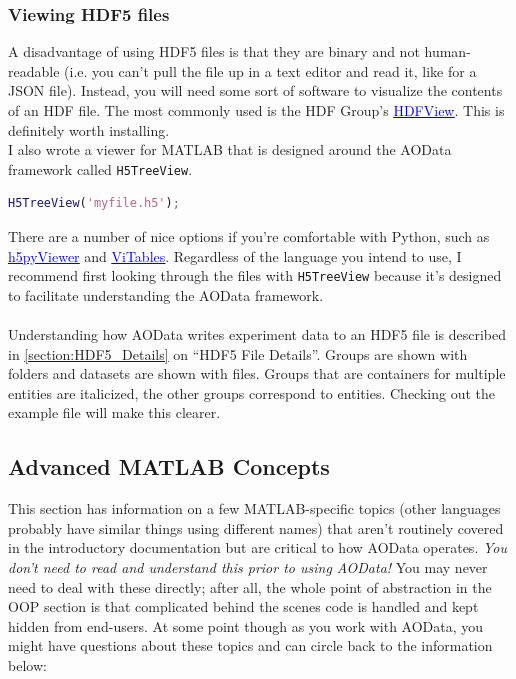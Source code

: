 \documentclass[10pt]{exam}
\newcommand{\comm}[1]{}
\newcommand\myurl[1]{\textcolor{blue}{\underline{#1}}}
\newcommand\aodclass[1]{\textcolor{codeblue}{\texttt{#1}}}
\begin{document}
		\subsubsection{Viewing HDF5 files}
			\noindent A disadvantage of using HDF5 files is that they are binary and not human-readable (i.e. you can't pull the file up in a text editor and read it, like for a JSON file). Instead, you will need some sort of software to visualize the contents of an HDF file. The most commonly used is the HDF Group's \href{https://www.hdfgroup.org/downloads/hdfview/}{\myurl{HDFView}}. This is definitely worth installing. 
			\\I also wrote a viewer for MATLAB that is designed around the AOData framework called \aodclass{H5TreeView}. 
			\begin{lstlisting}[language=matlab]
	H5TreeView('myfile.h5');
			\end{lstlisting}
			There are a number of nice options if you're comfortable with Python, such as \href{https://github.com/ganymede42/h5pyViewer}{\myurl{h5pyViewer}} and \href{https://vitables.org}{\myurl{ViTables}}. Regardless of the language you intend to use, I recommend first looking through the files with \aodclass{H5TreeView} because it's designed to facilitate understanding the AOData framework.
			\\$\quad$\\
			\noindent Understanding how AOData writes experiment data to an HDF5 file is described in \myurl{\ref{section:HDF5_Details}} on ``HDF5 File Details''. Groups are shown with folders and datasets are shown with files. Groups that are containers for multiple entities are italicized, the other groups correspond to entities. Checking out the example file will make this clearer.
			\comm{\begin{forest}
				pic dir tree,
				pic root,
				for tree={directory,},
				[Experiment
				[\textit{Sources}
					[Subject]
				]
				[\textit{Systems}
				[SystemOne
					[\textit{Channels}
						[ChannelOne
						[\textit{Devices}
						]
						]
					]
				]]
				[\textit{Calibrations}
					[PowerMeasurementOne
						[Data, file]
					]
				]
				[\textit{Segmentations}]
				[\textit{Epochs}
					[Epoch
						[\textit{Registrations}
						[StripRegistration
							[Data, file]
						]
						]
						[\textit{Stimuli}]
						[\textit{Responses}]
					]
				]
				]
			\end{forest}}
	\subsection{Advanced MATLAB Concepts}
		\noindent This section has information on a few MATLAB-specific topics (other languages probably have similar things using different names) that aren't routinely covered in the introductory documentation but are critical to how AOData operates. \textit{You don't need to read and understand this prior to using AOData!} You may never need to deal with these directly; after all, the whole point of abstraction in the OOP section is that complicated behind the scenes code is handled and kept hidden from end-users. At some point though as you work with AOData, you might have questions about these topics and can circle back to the information below:
\end{document}
